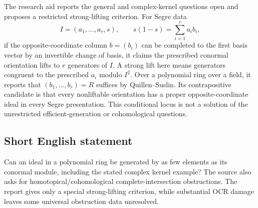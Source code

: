 \documentclass[11pt]{article}
\begin{document}
The research aid reports the general and complex-kernel questions open and proposes a restricted strong-lifting criterion. For Segre data
\[
 I=(a_1,\ldots,a_r,s),\qquad s(1-s)=\sum_{i=1}^ra_ib_i,
\]
if the opposite-coordinate column $b=(b_i)$ can be completed to the first basis vector by an invertible change of basis, it claims the prescribed conormal orientation lifts to $r$ generators of $I$. A strong lift here means generators congruent to the prescribed $a_i$ modulo $I^2$. Over a polynomial ring over a field, it reports that $(b_1,\ldots,b_r)=R$ suffices by Quillen--Suslin. Its contrapositive candidate is that every nonliftable orientation has a proper opposite-coordinate ideal in every Segre presentation. This conditional locus is not a solution of the unrestricted efficient-generation or cohomological questions.
\subsection{Short English statement}
Can an ideal in a polynomial ring be generated by as few elements as its conormal module, including the stated complex kernel example? The source also asks for homotopical/cohomological complete-intersection obstructions. The report gives only a special strong-lifting criterion, while substantial OCR damage leaves some universal obstruction data unresolved.
\end{document}
